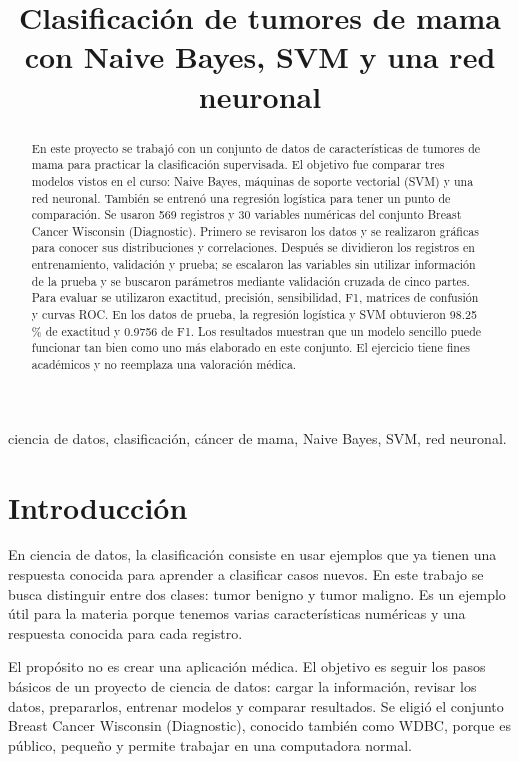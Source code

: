 \documentclass[conference]{IEEEtran}
\begin{document}
\title{Clasificación de tumores de mama con Naive Bayes, SVM y una red neuronal}
\author{
}
\maketitle
\begin{abstract}
En este proyecto se trabajó con un conjunto de datos de características de tumores de mama para practicar la clasificación supervisada. El objetivo fue comparar tres modelos vistos en el curso: Naive Bayes, máquinas de soporte vectorial (SVM) y una red neuronal. También se entrenó una regresión logística para tener un punto de comparación. Se usaron 569 registros y 30 variables numéricas del conjunto Breast Cancer Wisconsin (Diagnostic). Primero se revisaron los datos y se realizaron gráficas para conocer sus distribuciones y correlaciones. Después se dividieron los registros en entrenamiento, validación y prueba; se escalaron las variables sin utilizar información de la prueba y se buscaron parámetros mediante validación cruzada de cinco partes. Para evaluar se utilizaron exactitud, precisión, sensibilidad, F1, matrices de confusión y curvas ROC. En los datos de prueba, la regresión logística y SVM obtuvieron 98.25\,\% de exactitud y 0.9756 de F1. Los resultados muestran que un modelo sencillo puede funcionar tan bien como uno más elaborado en este conjunto. El ejercicio tiene fines académicos y no reemplaza una valoración médica.
\end{abstract}
\begin{IEEEkeywords}
ciencia de datos, clasificación, cáncer de mama, Naive Bayes, SVM, red neuronal.
\end{IEEEkeywords}

\section{Introducción}
En ciencia de datos, la clasificación consiste en usar ejemplos que ya tienen una respuesta conocida para aprender a clasificar casos nuevos. En este trabajo se busca distinguir entre dos clases: tumor benigno y tumor maligno. Es un ejemplo útil para la materia porque tenemos varias características numéricas y una respuesta conocida para cada registro.

El propósito no es crear una aplicación médica. El objetivo es seguir los pasos básicos de un proyecto de ciencia de datos: cargar la información, revisar los datos, prepararlos, entrenar modelos y comparar resultados. Se eligió el conjunto Breast Cancer Wisconsin (Diagnostic), conocido también como WDBC, porque es público, pequeño y permite trabajar en una computadora normal.
\end{document}
